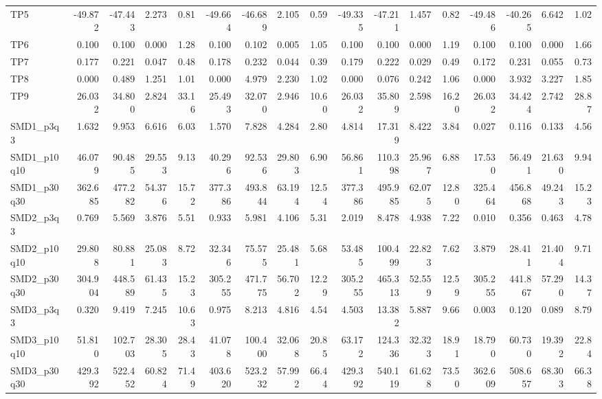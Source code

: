 \begin{longtable}{lrrrrrrrrrrrrrrrr}
TP5 & -49.872 & -47.443 & 2.273 & 0.81 & -49.664 & -46.689 & 2.105 & 0.59 & -49.335 & -47.211 & 1.457 & 0.82 & -49.486 & -40.265 & 6.642 & 1.02 \\
TP6 & 0.100 & 0.100 & 0.000 & 1.28 & 0.100 & 0.102 & 0.005 & 1.05 & 0.100 & 0.100 & 0.000 & 1.19 & 0.100 & 0.100 & 0.000 & 1.66 \\
TP7 & 0.177 & 0.221 & 0.047 & 0.48 & 0.178 & 0.232 & 0.044 & 0.39 & 0.179 & 0.222 & 0.029 & 0.49 & 0.172 & 0.231 & 0.055 & 0.73 \\
TP8 & 0.000 & 0.489 & 1.251 & 1.01 & 0.000 & 4.979 & 2.230 & 1.02 & 0.000 & 0.076 & 0.242 & 1.06 & 0.000 & 3.932 & 3.227 & 1.85 \\
TP9 & 26.032 & 34.800 & 2.824 & 33.16 & 25.493 & 32.070 & 2.946 & 10.60 & 26.032 & 35.809 & 2.598 & 16.20 & 26.032 & 34.424 & 2.742 & 28.87 \\
SMD1\_p3q3 & 1.632 & 9.953 & 6.616 & 6.03 & 1.570 & 7.828 & 4.284 & 2.80 & 4.814 & 17.319 & 8.422 & 3.84 & 0.027 & 0.116 & 0.133 & 4.56 \\
SMD1\_p10q10 & 46.079 & 90.485 & 29.553 & 9.13 & 40.296 & 92.536 & 29.803 & 6.90 & 56.861 & 110.398 & 25.967 & 6.88 & 17.530 & 56.491 & 21.630 & 9.94 \\
SMD1\_p30q30 & 362.685 & 477.282 & 54.376 & 15.72 & 377.386 & 493.844 & 63.194 & 12.54 & 377.386 & 495.985 & 62.075 & 12.80 & 325.464 & 456.868 & 49.243 & 15.23 \\
SMD2\_p3q3 & 0.769 & 5.569 & 3.876 & 5.51 & 0.933 & 5.981 & 4.106 & 5.31 & 2.019 & 8.478 & 4.938 & 7.22 & 0.010 & 0.356 & 0.463 & 4.78 \\
SMD2\_p10q10 & 29.808 & 80.881 & 25.083 & 8.72 & 32.346 & 75.575 & 25.481 & 5.68 & 53.485 & 100.499 & 22.823 & 7.62 & 3.879 & 28.411 & 21.404 & 9.71 \\
SMD2\_p30q30 & 304.904 & 448.589 & 61.435 & 15.23 & 305.255 & 471.775 & 56.702 & 12.29 & 305.255 & 465.313 & 52.559 & 12.59 & 305.255 & 441.867 & 57.290 & 14.37 \\
SMD3\_p3q3 & 0.320 & 9.419 & 7.245 & 10.63 & 0.975 & 8.213 & 4.816 & 4.54 & 4.503 & 13.382 & 5.887 & 9.66 & 0.003 & 0.120 & 0.089 & 8.79 \\
SMD3\_p10q10 & 51.810 & 102.703 & 28.305 & 28.43 & 41.078 & 100.400 & 32.068 & 20.85 & 63.172 & 124.336 & 32.323 & 18.91 & 18.790 & 60.730 & 19.392 & 22.84 \\
SMD3\_p30q30 & 429.392 & 522.452 & 60.824 & 71.49 & 403.620 & 523.232 & 57.992 & 66.44 & 429.392 & 540.119 & 61.628 & 73.50 & 362.609 & 508.657 & 68.303 & 66.38 \\

\end{longtable}
